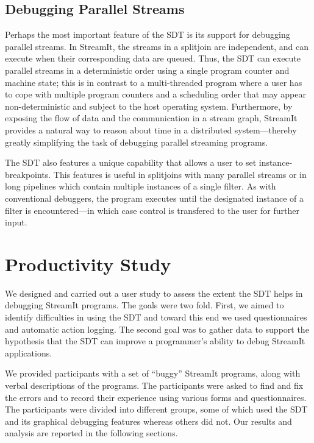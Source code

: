 \documentclass[times, 10pt,twocolumn]{article}
\begin{document}
\subsection{Debugging Parallel Streams}

Perhaps  the most  important feature  of the  SDT is  its  support for
debugging parallel  streams. In StreamIt,  the streams in  a splitjoin
are  independent, and can  execute when  their corresponding  data are
queued.  Thus, the SDT can execute parallel streams in a deterministic
order using  a single  program counter and  machine state; this  is in
contrast to  a multi-threaded  program where a  user has to  cope with
multiple  program counters  and  a scheduling  order  that may  appear
non-deterministic   and  subject   to  the   host   operating  system.
Furthermore, by exposing  the flow of data and  the communication in a
stream graph, StreamIt provides a  natural way to reason about time in
a  distributed  system---thereby   greatly  simplifying  the  task  of
debugging parallel streaming programs.

The SDT  also features a unique  capability that allows a  user to set
instance-breakpoints. This features is useful in splitjoins with many
parallel streams or in long pipelines which contain multiple instances
of  a  single filter.  As  with  conventional  debuggers, the  program
executes until the designated instance of a filter is encountered---in
which case control is transfered to the user for further input.



\section{Productivity Study}
\label{sec:ps}

We designed and carried out a  user study to assess the extent the SDT
helps in debugging StreamIt programs.  The goals were two fold. First,
we aimed to identify difficulties in using the SDT and toward this end
we used questionnaires and  automatic action logging.  The second goal
was to gather data to support  the hypothesis that the SDT can improve
a programmer's ability to debug StreamIt applications.

We provided  participants with a  set of ``buggy''  StreamIt programs,
along with verbal descriptions of the programs.  The participants were
asked to find and fix the  errors and to record their experience using
various forms  and questionnaires.  The participants  were divided into
different  groups,  some of  which  used  the  SDT and  its  graphical
debugging features  whereas others did not.  Our  results and analysis
are reported  in the  following sections.
\end{document}
